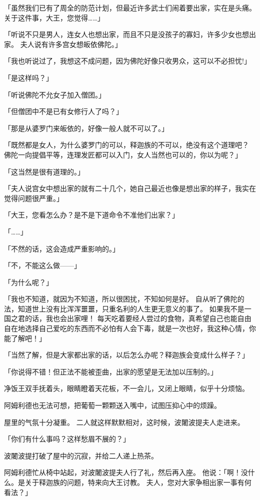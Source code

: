 \documentclass[twoside,openany]{book}
\begin{document}
「虽然我们已有了周全的防范计划，但最近许多武士们闹着要出家，实在是头痛。
关于这件事，大王，您觉得……」

「听说不只是男人，连女人也想出家，而且不只是没孩子的寡妇，许多少女也想出家。
夫人说有许多宫女想皈依佛陀。」

「我也听说过了，我想这不成问题，因为佛陀好像只收男众，这可以不必担忧!」

「是这样吗？」

「听说佛陀不允女子加入僧团。」

「但僧团中不是已有女修行人了吗？」

「那是从婆罗门来皈依的，好像一般人就不可以了。」

「既然都是女人，为什么婆罗门的可以，释迦族的不可以，绝没有这个道理吧？
佛陀一向提倡平等，连理发匠都可以入门，女人当然也可以的，你以为呢？」

「这当然是很有道理的。」

「夫人说宫女中想出家的就有二十几个，她自己最近也像是想出家的样子，我实在觉得问题很严重。」

「大王，您看怎么办？是不是下道命令不准他们出家？」

「……」

「不然的话，这会造成严重影响的。」

「不，不能这么做——」

「为什么呢？」

「我也不知道，就因为不知道，所以很困扰，不知如何是好。
自从听了佛陀的法，知道世上没有比浑浑噩噩，只重名利的人生更无意义的事了。
如果我不是一国之君的话，我也会出家哩！
每天吃着要经人尝过的食物，真希望自己也能自由自在地选择自己爱吃的东西而不必怕有人会下毒，就是一次也好，我这种心情，你能了解吧！」

「当然了解，但是大家都出家的话，以后怎么办呢？释迦族会变成什么样子？」

「你说得不错！但正法不能被歪曲，出家的愿望是无法加以压制的。」

净饭王双手抚着头，眼睛瞪着天花板，不一会儿，又闭上眼睛，似乎十分烦恼。

阿姆利德也无法可想，把葡萄一颗颗送入嘴中，试图压抑心中的烦躁。

屋里的气氛十分凝重。
二人就这样默默相对，这时候，波闍波提夫人走进来。

「你们有什么事吗？这样愁眉不展的？」

波闍波提打破了屋中的沉寂，并给二人递上热茶。

阿姆利德忙从椅中站起，对波闍波提夫人行了礼，然后再入座。
他说：「啊！没什么。是关于释迦族的问题，特来向大王讨教。
夫人，您对大家争相出家一事有何看法？」
\end{document}
